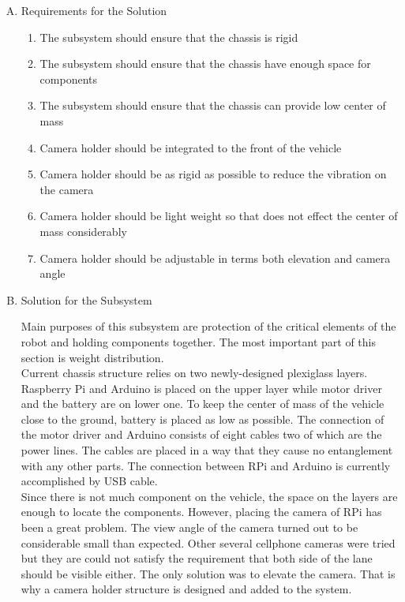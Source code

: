 \documentclass[a4paper,12pt]{article}
\begin{document}
\begin{enumerate}[A.]

\item {Requirements for the Solution}


\begin{enumerate}[1)]

\item The subsystem should ensure that the chassis is rigid 

\item The subsystem should ensure that the chassis have enough space for components

\item The subsystem should ensure that the chassis can provide low center of mass 

\item Camera holder should be integrated to the front of the vehicle

\item Camera holder should be as rigid as possible to reduce the vibration on the camera

\item Camera holder should be light weight so that does not effect the center of mass considerably

\item Camera holder should be adjustable in terms both elevation and camera angle


\end{enumerate}


\item {Solution for the Subsystem}

Main purposes of this subsystem are protection of the critical elements of the robot and holding components together. The most important part of this section is weight distribution.\\

Current chassis structure relies on two newly-designed plexiglass layers. Raspberry Pi and Arduino is placed on the upper layer while motor driver and the battery are on lower one. To keep the center of mass of the vehicle close to the ground, battery is placed as low as possible. The connection of the motor driver and Arduino consists of eight cables two of which are the power lines. The cables are placed in a way that they cause no entanglement with any other parts. The connection between RPi and Arduino is currently accomplished by USB cable. \\


Since there is not much component on the vehicle, the space on the layers are enough to locate the components. However, placing the camera of RPi has been a great problem. The view angle of the camera turned out to be considerable small than expected. Other several cellphone cameras were tried but they are could not satisfy the requirement that both side of the lane should be visible either. The only solution was to elevate the camera. That is why a camera holder structure is designed and added to the system.\\	



\end{enumerate}
\end{document}
